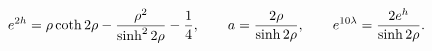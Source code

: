 \begin{equation}
e^{2h}=\rho \coth{2\rho}-{\rho^2 \over \sinh^2{2\rho}}-{1\over4},\qquad
a={2\rho \over \sinh{2\rho}},\qquad
e^{10\lambda}={2e^h\over \sinh{2\rho}}.
\end{equation}

